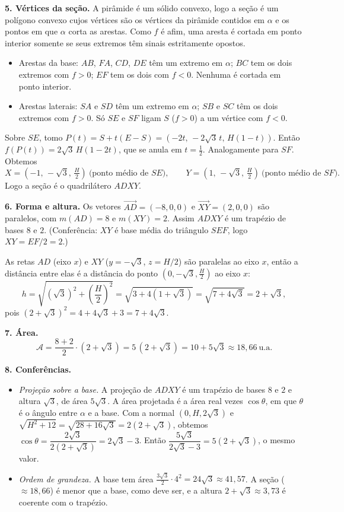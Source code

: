 \documentclass{article}%
\begin{document}
\textbf{5. Vértices da seção.} A pirâmide é um sólido convexo, logo a seção é um polígono convexo cujos vértices são os vértices da pirâmide contidos em $\alpha$ e os pontos em que $\alpha$ corta as arestas. Como $f$ é afim, uma aresta é cortada em ponto interior somente se seus extremos têm sinais estritamente opostos.
\begin{itemize}
\item Arestas da base: $AB$, $FA$, $CD$, $DE$ têm um extremo em $\alpha$; $BC$ tem os dois extremos com $f>0$; $EF$ tem os dois com $f<0$. Nenhuma é cortada em ponto interior.
\item Arestas laterais: $SA$ e $SD$ têm um extremo em $\alpha$; $SB$ e $SC$ têm os dois extremos com $f>0$. Só $SE$ e $SF$ ligam $S$ ($f>0$) a um vértice com $f<0$.
\end{itemize}
Sobre $SE$, tomo $P(t)=S+t(E-S)=\left(-2t,\,-2\sqrt{3}\,t,\,H(1-t)\right)$. Então $f(P(t))=2\sqrt{3}\,H(1-2t)$, que se anula em $t=\tfrac12$. Analogamente para $SF$. Obtemos
\[
X=\left(-1,\,-\sqrt{3},\,\tfrac{H}{2}\right)\ \text{(ponto médio de }SE\text{)},\qquad Y=\left(1,\,-\sqrt{3},\,\tfrac{H}{2}\right)\ \text{(ponto médio de }SF\text{)}.
\]
Logo a seção é o quadrilátero $ADXY$.

\textbf{6. Forma e altura.} Os vetores $\overrightarrow{AD}=(-8,0,0)$ e $\overrightarrow{XY}=(2,0,0)$ são paralelos, com $m(AD)=8$ e $m(XY)=2$. Assim $ADXY$ é um trapézio de bases $8$ e $2$. (Conferência: $XY$ é base média do triângulo $SEF$, logo $XY=EF/2=2$.)

As retas $AD$ (eixo $x$) e $XY$ ($y=-\sqrt{3}$, $z=H/2$) são paralelas ao eixo $x$, então a distância entre elas é a distância do ponto $\left(0,-\sqrt{3},\tfrac{H}{2}\right)$ ao eixo $x$:
\[
h=\sqrt{(\sqrt{3})^2+\left(\frac{H}{2}\right)^2}=\sqrt{3+4(1+\sqrt{3})}=\sqrt{7+4\sqrt{3}}=2+\sqrt{3},
\]
pois $(2+\sqrt{3})^2=4+4\sqrt{3}+3=7+4\sqrt{3}$.

\textbf{7. Área.}
\[
\mathcal{A}=\frac{8+2}{2}\cdot(2+\sqrt{3})=5\,(2+\sqrt{3})=10+5\sqrt{3}\approx 18{,}66\ \text{u.a.}
\]

\textbf{8. Conferências.}
\begin{itemize}
\item \textit{Projeção sobre a base.} A projeção de $ADXY$ é um trapézio de bases $8$ e $2$ e altura $\sqrt{3}$, de área $5\sqrt{3}$. A área projetada é a área real vezes $\cos\theta$, em que $\theta$ é o ângulo entre $\alpha$ e a base. Com a normal $(0,H,2\sqrt{3})$ e $\sqrt{H^2+12}=\sqrt{28+16\sqrt{3}}=2(2+\sqrt{3})$, obtemos $\cos\theta=\dfrac{2\sqrt{3}}{2(2+\sqrt{3})}=2\sqrt{3}-3$. Então $\dfrac{5\sqrt{3}}{2\sqrt{3}-3}=5(2+\sqrt{3})$, o mesmo valor.
\item \textit{Ordem de grandeza.} A base tem área $\frac{3\sqrt{3}}{2}\cdot 4^2=24\sqrt{3}\approx 41{,}57$. A seção ($\approx 18{,}66$) é menor que a base, como deve ser, e a altura $2+\sqrt{3}\approx 3{,}73$ é coerente com o trapézio.
\end{itemize}
\end{document}
